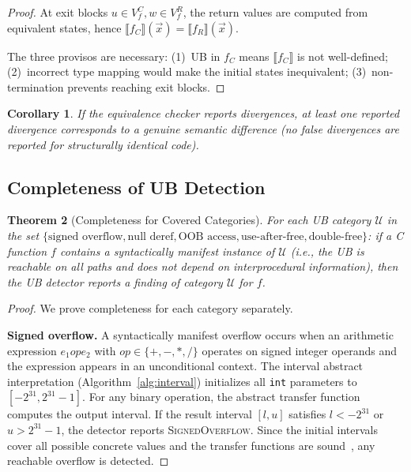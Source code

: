 \documentclass[11pt,a4paper]{article}
\newtheorem{theorem}{Theorem}
\newtheorem{corollary}[theorem]{Corollary}
\begin{document}
\begin{appendices}
\begin{proof}
At exit blocks $u \in V_f^C, w \in V_f^R$, the return values are
computed from equivalent states, hence
$\llbracket f_C \rrbracket(\vec{x}) = \llbracket f_R \rrbracket(\vec{x})$.

The three provisos are necessary:
(1)~UB in $f_C$ means $\llbracket f_C \rrbracket$ is not well-defined;
(2)~incorrect type mapping would make the initial states inequivalent;
(3)~non-termination prevents reaching exit blocks.
\end{proof}

\begin{corollary}
If the equivalence checker reports divergences, at least one reported
divergence corresponds to a genuine semantic difference (no false
divergences are reported for structurally identical code).
\end{corollary}

\subsection{Completeness of UB Detection}

\begin{theorem}[Completeness for Covered Categories]\label{thm:ub-complete}
For each UB category $\mathcal{U}$ in the set
$\{\text{signed overflow}, \text{null deref}, \text{OOB access},
\text{use-after-free}, \text{double-free}\}$:
if a C function $f$ contains a \emph{syntactically manifest} instance
of $\mathcal{U}$ (i.e., the UB is reachable on all paths and does not
depend on interprocedural information), then the UB detector reports
a finding of category $\mathcal{U}$ for $f$.
\end{theorem}

\begin{proof}
We prove completeness for each category separately.

\textbf{Signed overflow.}
A syntactically manifest overflow occurs when an arithmetic expression
$e_1 \mathbin{op} e_2$ with $op \in \{+, -, *, /\}$ operates on
signed integer operands and the expression appears in an unconditional
context. The interval abstract interpretation
(Algorithm~\ref{alg:interval}) initializes all \texttt{int} parameters
to $[-2^{31}, 2^{31}-1]$. For any binary operation, the abstract
transfer function computes the output interval. If the result interval
$[l, u]$ satisfies $l < -2^{31}$ or $u > 2^{31}-1$, the detector
reports \textsc{SignedOverflow}. Since the initial intervals cover
all possible concrete values and the transfer functions are
sound~\cite{cousot1977abstract}, any reachable overflow is detected.


\end{proof}
\end{appendices}
\end{document}
